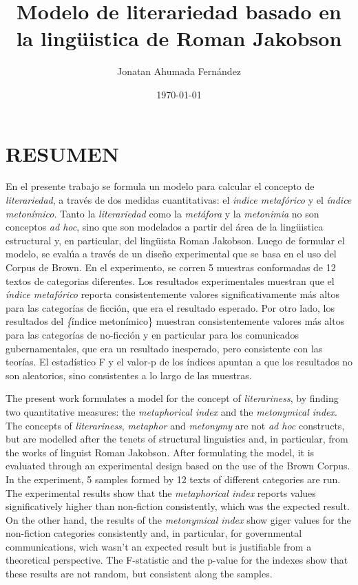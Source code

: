 \documentclass[12pt,letterpaper,twoside]{article}
\author{Jonatan Ahumada Fernández}
\date{\today}
\title{Modelo de literariedad basado en la lingüistica de Roman Jakobson}
\begin{document}
\maketitle
\tableofcontents

\doublespacing
\raggedright
\setlength{\parindent}{1.25cm}





\section{RESUMEN}
\label{sec:org5f814c0}

En el presente trabajo se formula un modelo para calcular el concepto
de \emph{literariedad}, a través de dos medidas cuantitativas: el
\emph{indice metafórico} y el \emph{índice metonímico}.  Tanto la
\emph{literariedad} como la \emph{metáfora} y la \emph{metonimia} no
son conceptos \emph{ad hoc}, sino que son modelados a partir del área
de la lingüistica estructural y, en particular, del lingüista Roman
Jakobson. Luego de formular el modelo, se evalúa a través de un diseño
experimental que se basa en el uso del Corpus de Brown. En el
experimento, se corren 5 muestras conformadas de 12 textos de
categorias diferentes. Los resultados experimentales muestran que el
\emph{índice metafórico} reporta consistentemente valores
significativamente más altos para las categorías de ficción, que era
el resultado esperado. Por otro lado, los resultados del \emph\{índice
metonímico\} muestran consistentemente valores más altos para las
categorías de no-ficción y en particular para los comunicados
gubernamentales, que era un resultado inesperado, pero consistente con
las teorías. El estadístico F y el valor-p de los índices apuntan a
que los resultados no son aleatorios, sino consistentes a lo largo de
las muestras.



The present work formulates a model for the concept of
\emph{literariness}, by finding two quantitative measures: the
\emph{metaphorical index} and the \emph{metonymical index}.  The
concepts of \emph{literariness}, \emph{metaphor} and \emph{metonymy}
are not \emph{ad hoc} constructs, but are modelled after the tenets
of structural linguistics and, in particular, from the works of
linguist Roman Jakobson. After formulating the model, it is evaluated
through an experimental design based on the use of the Brown
Corpus. In the experiment, 5 samples formed by 12 texts of different
categories are run.  The experimental results show that the
\emph{metaphorical index} reports values significatively higher than
non-fiction consistently, which was the expected result. On the other
hand, the results of the \emph{metonymical index} show giger values
for the non-fiction categories consistently and, in particular, for
governmental communications, wich wasn't an expected result but is
justifiable from a theoretical perspective.  The F-statistic and the
p-value for the indexes show that these results are not random, but
consistent along the samples.  
\end{document}
